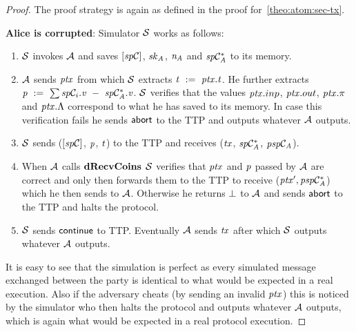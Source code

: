 \begin{proof}
    The proof strategy is again as defined in the proof for~\cref{theo:atom:sec-tx}.

    \textbf{Alice is corrupted}: Simulator $\mathcal{S}$ works as follows:
    \begin{enumerate}
        \item $\mathcal{S}$ invokes $\mathcal{A}$ and saves $[\mathit{sp}\mathcal{C}]$, $\mathit{sk}_{\mathit{A}}$, $\mathit{\mathit{n}_{\mathit{A}}}$ and $\mathit{sp}\mathcal{C}_{\mathit{A}}^*$ to its memory.
        \item $\mathcal{A}$ sends $\mathit{ptx}$ from which $\mathcal{S}$ extracts $\mathit{t} ~:=~ \mathit{ptx}.\mathit{t}$.
        He further extracts $\mathit{p} ~:=~ \sum\mathit{sp}\mathcal{C}_i.\mathit{v} ~-~ \mathit{sp}\mathcal{C}_{\mathit{A}}^*.\mathit{v}$.
        $\mathcal{S}$ verifies that the values $\mathit{ptx}.inp$, $\mathit{ptx}.out$, $\mathit{ptx}.\pi$ and $\mathit{ptx}.\Lambda$ correspond to what he has saved to its memory.
        In case this verification fails he sends $\mathsf{abort}$ to the TTP and outputs whatever $\mathcal{A}$ outputs.
        \item $\mathcal{S}$ sends ($[\mathit{sp}\mathcal{C}]$, $\mathit{p}$, $\mathit{t}$) to the TTP and receives ($\mathit{tx}$, $\mathit{sp}\mathcal{C}_{\mathit{A}}^*$, $\mathit{psp}\mathcal{C}_{\mathit{A}}$).
        \item When $\mathcal{A}$ calls $\mathbf{dRecvCoins}$ $\mathcal{S}$ verifies that $\mathit{ptx}$ and $\mathit{p}$ passed by $\mathcal{A}$ are correct and only then forwards them to the TTP to receive (${\mathit{ptx}}', \mathit{psp}\mathcal{C}_{\mathit{A}}^*$) which he then sends to $\mathcal{A}$.
        Otherwise he returns $\bot$ to $\mathcal{A}$ and sends $\mathsf{abort}$ to the TTP and halts the protocol.
        \item $\mathcal{S}$ sends $\mathsf{continue}$ to TTP.
        Eventually $\mathcal{A}$ sends $\mathit{tx}$ after which $\mathcal{S}$ outputs whatever $\mathcal{A}$ outputs.
    \end{enumerate}

    It is easy to see that the simulation is perfect as every simulated message exchanged between the party is identical to what would be expected in a real execution.
    Also if the adversary cheats (by sending an invalid $\mathit{ptx}$) this is noticed by the simulator who then halts the protocol and outputs whatever $\mathcal{A}$ outputs, which is again what would be expected in a real protocol execution.


\end{proof}
